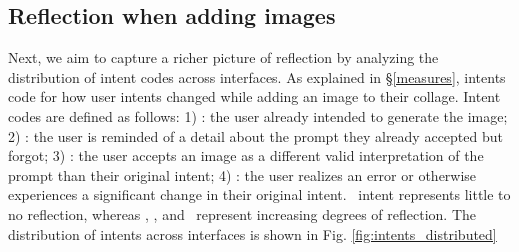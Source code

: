 \subsection{Reflection when adding images}
\label{adding-images}


Next, we aim to capture a richer picture of reflection by analyzing the distribution of intent codes across interfaces. 
As explained in \S\ref{measures}, intents code for how user intents changed while adding an image to their collage.
Intent codes are defined as follows: 1) \direct: the user already intended to generate the image; 2) \reminder: the user is reminded of a detail about the prompt they already accepted but forgot; 3) \expansion: the user accepts an image as a different valid interpretation of the prompt than their original intent; 4) \challenge: the user realizes an error or otherwise experiences a significant change in their original intent. \direct~intent represents little to no reflection, whereas \reminder, \expansion, and \challenge~represent increasing degrees of reflection. The distribution of intents across interfaces is shown in Fig. \ref{fig:intents_distributed}

